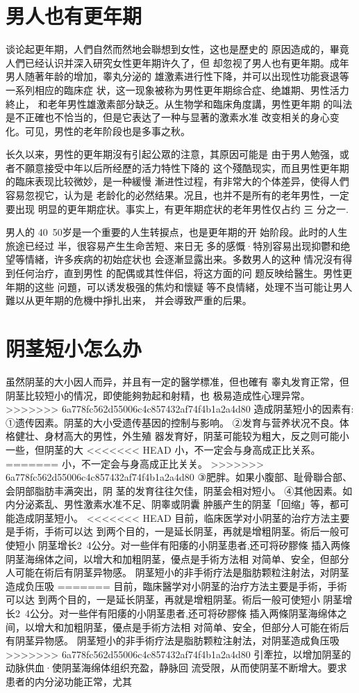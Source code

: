 \documentclass[12pt,UTF8]{ctexbook}
\begin{document}
\section{男人也有更年期}

谈论起更年期，人們自然而然地会聯想到女性，这也是歷史的
原因造成的，畢竟人們已经认识并深入研究女性更年期许久了，但
却忽视了男人也有更年期。成年男人随著年龄的增加，睾丸分泌的
雄激素进行性下降，并可以出现性功能衰退等一系列相应的臨床症
状，这一现象被称为男性更年期综合症、绝雄期、男性活力終止，
和老年男性雄激素部分缺乏。从生物学和臨床角度講，男性更年期
的叫法是不正確也不恰当的，但是它表达了一种与显著的激素水准
改变相关的身心变化。可见，男性的老年阶段也是多事之秋。

长久以来，男性的更年期沒有引起公眾的注意，其原因可能是
由于男人勉强，或者不願意接受中年以后所经歷的活力特性下降的
这个殘酷现实，而且男性更年期的臨床表现比较微妙，是一种緩慢
漸进性过程，有非常大的个体差异，使得人們容易忽视它，认为是
老龄化的必然结果。况且，也并不是所有的老年男性，一定要出现
明显的更年期症状。事实上，有更年期症状的老年男性仅占约 三
分之一.

男人的 40~50岁是一个重要的人生转捩点，也是更年期的开
始阶段。此时的人生旅途已经过
半，很容易产生生命苦短、来日无
多的感慨·特別容易出现抑鬱和绝
望等情緒，许多疾病的初始症状也
会逐漸显露出来。多数男人的这种
情况沒有得到任何治疗，直到男性
的配偶或其性伴侣，将这方面的问
题反映给醫生。男性更年期的这些
问題，可以诱发极强的焦灼和懷疑
等不良情緒，处理不当可能让男人
難以从更年期的危機中掙扎出来，
并会導致严重的后果。

\section{阴茎短小怎么办}

虽然阴茎的大小因人而异，并且有一定的醫学標准，但也確有
睾丸发育正常，但阴茎比较短小的情况，即使能夠勃起和射精，也
极易造成性心理异常。
>>>>>>> 6a778fc562d55006c4c857432af74f4b1a2a4d80
造成阴茎短小的因素有:
①遗传因素。阴茎的大小受遗传基因的控制与影响。
②发育与营养状况不良。体格健壮、身材高大的男性，外生殖
器发育好，阴茎可能较为粗大，反之则可能小一些，但阴茎的大
<<<<<<< HEAD
小，不一定会与身高成正比关系。
=======
小，不一定会与身高成正比关关。
>>>>>>> 6a778fc562d55006c4c857432af74f4b1a2a4d80
③肥胖。如果小腹部、耻骨聯合部、会阴部脂肪丰满突出，阴
茎的发育往往欠佳，阴茎会相对短小。
④其他因素。如内分泌紊乱、男性激素水准不足、阴睾或阴囊
肿脹产生的阴茎「回缩」等，都可能造成阴茎短小。
<<<<<<< HEAD
目前，临床医学对小阴茎的治疗方法主要是手術，手術可以达
到两个目的，一是延长阴茎，再就是增粗阴茎。術后一般可使短小
阴茎增长2~4公分。对一些伴有阳痿的小阴茎患者,还可将矽膠條
插入两條阴茎海绵体之间，以增大和加粗阴茎，優点是手術方法相
对简单、安全，但部分人可能在術后有阴茎异物感。
阴茎短小的非手術疗法是脂肪颗粒注射法，对阴茎造成负压吸
=======
目前，臨床醫学对小阴茎的治疗方法主要是手術，手術可以达
到两个目的，一是延长阴茎，再就是增粗阴茎。術后一般可使短小
阴茎增长2~4公分。对一些伴有阳痿的小阴茎患者,还可将矽膠條
插入两條阴茎海绵体之间，以增大和加粗阴茎，優点是手術方法相
对简单、安全，但部分人可能在術后有阴茎异物感。
阴茎短小的非手術疗法是脂肪颗粒注射法，对阴茎造成負压吸
>>>>>>> 6a778fc562d55006c4c857432af74f4b1a2a4d80
引牽拉，以增加阴茎的动脉供血·使阴茎海绵体组织充盈，静脉回
流受限，从而使阴茎不断增大。要求患者的内分泌功能正常，尤其
\end{document}
